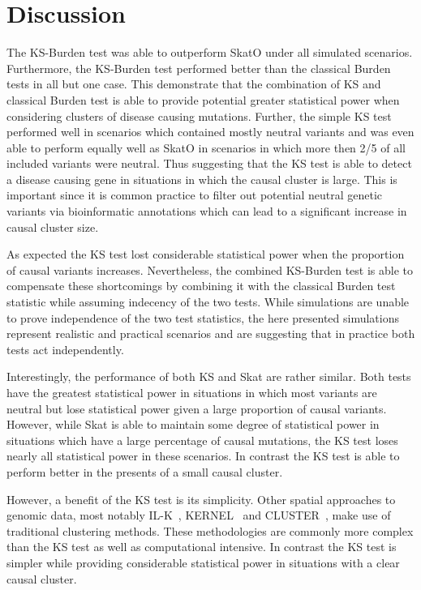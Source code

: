 \section{Discussion}
\label{sec:discussion_ks}

The KS-Burden test was able to outperform SkatO under all simulated scenarios.
Furthermore, the KS-Burden test performed better than the classical Burden tests in all but one case.
This demonstrate that the combination of KS and classical Burden test is able to provide potential greater statistical power when considering clusters of disease causing mutations.
Further, the simple KS test performed well in scenarios which contained mostly neutral variants and was even able to perform equally well as SkatO in scenarios in which more then 2/5 of all included variants were neutral.
Thus suggesting that the KS test is able to detect a disease causing gene in situations in which the causal cluster is large.
This is important since it is common practice to filter out potential neutral genetic variants via bioinformatic annotations which can lead to a significant increase in causal cluster size.

As expected the KS test lost considerable statistical power when the proportion of causal variants increases.
Nevertheless, the combined KS-Burden test is able to compensate these shortcomings by combining it with the classical Burden test statistic while assuming indecency of the two tests.
While simulations are unable to prove independence of the two test statistics, the here presented simulations represent realistic and practical scenarios and are suggesting that in practice both tests act independently.

Interestingly, the performance of both KS and Skat are rather similar.
Both tests have the greatest statistical power in situations in which most variants are neutral but lose statistical power given a large proportion of causal variants.
However, while Skat is able to maintain some degree of statistical power in situations which have a large percentage of causal mutations, the KS test loses nearly all statistical power in these scenarios.
In contrast the KS test is able to perform better in the presents of a small causal cluster.

However, a benefit of the KS test is its simplicity.
Other spatial approaches to genomic data, most notably IL-K~\cite{Ionita-Laza2012}, KERNEL~\cite{Schaid2013} and CLUSTER~\cite{Lin2014}, make use of traditional clustering methods.
These methodologies are commonly more complex than the KS test as well as computational intensive.
In contrast the KS test is simpler while providing considerable statistical power in situations with a clear causal cluster.

